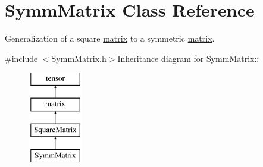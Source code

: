 \hypertarget{classJKBuilder_1_1SymmMatrix}{
\section{SymmMatrix Class Reference}
\label{classJKBuilder_1_1SymmMatrix}
}


Generalization of a square \hyperlink{classJKBuilder_1_1matrix}{matrix} to a symmetric \hyperlink{classJKBuilder_1_1matrix}{matrix}.  


{\ttfamily \#include $<$SymmMatrix.h$>$}Inheritance diagram for SymmMatrix::\begin{figure}[H]
\begin{center}
\leavevmode
\includegraphics[height=4cm]{classJKBuilder_1_1SymmMatrix}
\end{center}
\end{figure}
